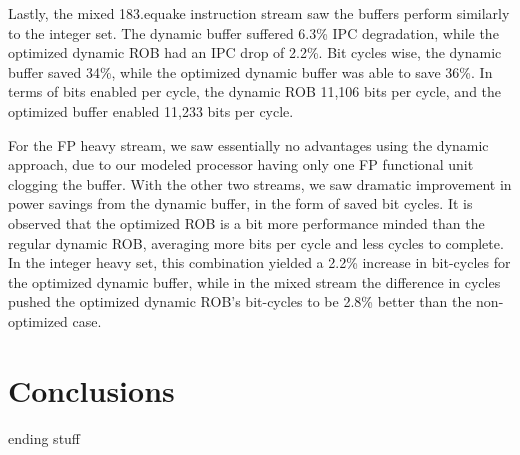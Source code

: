 Lastly, the mixed 183.equake instruction stream saw the buffers perform similarly to the integer set. The dynamic buffer suffered 6.3\% IPC degradation, while the optimized dynamic ROB had an IPC drop of 2.2\%. Bit cycles wise, the dynamic buffer saved 34\%, while the optimized dynamic buffer was able to save 36\%. In terms of bits enabled per cycle, the dynamic ROB 11,106 bits per cycle, and the optimized buffer enabled 11,233 bits per cycle.

For the FP heavy stream, we saw essentially no advantages using the dynamic approach, due to our modeled processor having only one FP functional unit clogging the buffer. With the other two streams, we saw dramatic improvement in power savings from the dynamic buffer, in the form of saved bit cycles. It is observed that the optimized ROB is a bit more performance minded than the regular dynamic ROB, averaging more bits per cycle and less cycles to complete. In the integer heavy set, this combination yielded a 2.2\% increase in bit-cycles for the optimized dynamic buffer, while in the mixed stream the difference in cycles pushed the optimized dynamic ROB's bit-cycles to be 2.8\% better than the non-optimized case.

\section{Conclusions}
ending stuff
